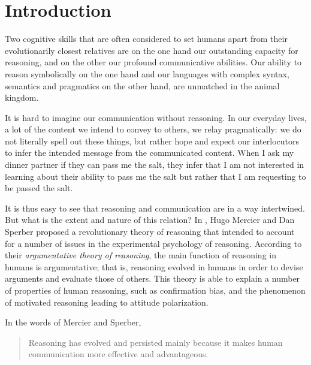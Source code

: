 \chapter*{Introduction}
\label{sec:introduction}


Two cognitive skills that are often considered to set humans apart from their evolutionarily closest relatives are on the one hand our outstanding capacity for reasoning, and on the other our profound communicative abilities.
Our ability to reason symbolically on the one hand
and
our languages with complex syntax, semantics and pragmatics on the other hand, are unmatched in the animal kingdom.

It is hard to imagine our communication without reasoning. In our everyday lives, a lot of the content we intend to convey to others, we relay pragmatically: we do not literally spell out these things, but rather hope and expect our interlocutors to infer the intended message from the communicated content.
When I ask my dinner partner if they can pass me the salt, they infer that I am not interested in learning about their ability to pass me the salt but rather that I am requesting to be passed the salt.

It is thus easy to see that reasoning and communication are in a way intertwined. But what is the extent and nature of this relation?
In \citeyear{MS11}, Hugo Mercier and Dan Sperber proposed a revolutionary theory of reasoning that intended to account for a number of issues in the experimental psychology of reasoning.
According to their \emph{argumentative theory of reasoning}, the main function of reasoning in humans is argumentative; that is, reasoning evolved in humans in order to devise arguments and evaluate those of others. This theory is able to explain a number of properties of human reasoning, such as confirmation bias, and the phenomenon of motivated reasoning leading to attitude polarization.

In the words of Mercier and Sperber,
\begin{quote}
    Reasoning has evolved and persisted mainly because it makes human communication more effective and advantageous.
    \citep[p.~60]{MS11}
\end{quote}

